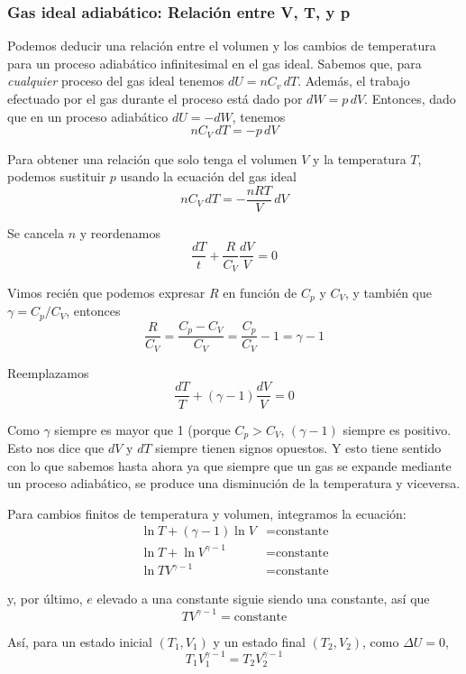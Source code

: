 \documentclass[12pt]{article}
\begin{document}
  \subsubsection{Gas ideal adiabático: Relación entre V, T, y p}
  Podemos deducir una relación entre el volumen y los cambios de temperatura para un proceso adiabático infinitesimal en el gas ideal. Sabemos que, para \textit{cualquier} proceso del gas ideal tenemos $ dU = nC_{v}\,dT $. Además, el trabajo efectuado por el gas durante el proceso está dado por $ dW = p\,dV $. Entonces, dado que en un proceso adiabático $ dU = -dW $, tenemos
  \[
  nC_{V}\,dT = -p\,dV
  \]

  Para obtener una relación que solo tenga el volumen $ V $ y la temperatura $ T $, podemos sustituir $ p $ usando la ecuación del gas ideal
  \[
  nC_{V}\,dT = -\frac{nRT}{V}\,dV 
  \]
  
  Se cancela $ n $ y reordenamos
  \[
  \frac{dT}{t} + \frac{R}{C_{V}}\frac{dV}{V} = 0
  \]

  Vimos recién que podemos expresar $ R $ en función de $ C_{p} $ y $ C_{V} $, y también que $ \gamma = C_{p}/C_{V} $, entonces
  \[
    \frac{R}{C_{V}} = \frac{C_{p}-C_{V}}{C_{V}} = \frac{C_{p}}{C_{V}} - 1 = \gamma - 1
  \]

  Reemplazamos
  \[
  \frac{dT}{T} + (\gamma - 1) \frac{dV}{V} = 0
  \]

  Como $ \gamma $ siempre es mayor que 1 (porque $ C_{p} > C_{V} $, $ (\gamma - 1) $ siempre es positivo. Esto nos dice que $ dV $ y $ dT $ siempre tienen signos opuestos. Y esto tiene sentido con lo que sabemos hasta ahora ya que siempre que un gas se expande mediante un proceso adiabático, se produce una disminución de la temperatura y viceversa.

  Para cambios finitos de temperatura y volumen, integramos la ecuación:
  \begin{align*}
    \ln{T} + (\gamma - 1)\ln{V} &= \text{constante}\\
    \ln{T} + \ln{V^{\gamma - 1}} &= \text{constante}\\
    \ln{TV^{\gamma - 1}} &= \text{constante}
  \end{align*}

  y, por último, $ e $ elevado a una constante siguie siendo una constante, así que
  \[
  TV^{\gamma - 1} = \text{constante}
  \]

  Así, para un estado inicial $ (T_{1}, V_{1}) $ y un estado final $ (T_{2}, V_{2}) $, como $ \Delta U = 0 $,
  \[
  T_{1}V_{1}^{\gamma - 1} = T_{2}V_{2}^{\gamma - 1} 
  \]
\end{document}

